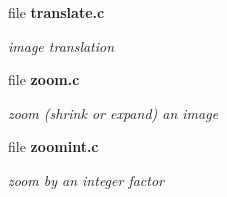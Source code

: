 \begin{CompactItemize}
\item 
file \bf{translate.c}
\begin{CompactList}\small\item\em image translation \item\end{CompactList}

\item 
file \bf{zoom.c}
\begin{CompactList}\small\item\em zoom (shrink or expand) an image \item\end{CompactList}

\item 
file \bf{zoomint.c}
\begin{CompactList}\small\item\em zoom by an integer factor \item\end{CompactList}

\end{CompactItemize}
